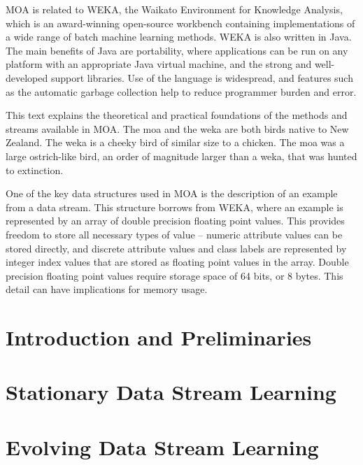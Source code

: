 \documentclass[a4paper,12pt,twoside]{book}
\begin{document}
MOA is related to WEKA, the Waikato
Environment for Knowledge Analysis, which is an award-winning open-source 
workbench containing implementations of a wide range of batch machine 
learning methods. WEKA is also written in Java. The main benefits
of Java are portability, where applications can be run on any platform with
an appropriate Java virtual machine, and the strong and well-developed support 
libraries. Use of the language is widespread, and features such as the
automatic garbage collection help to reduce programmer burden and error.

This text explains the theoretical and practical foundations of the methods and streams available in MOA.
The moa and the weka are both birds native to New Zealand. The weka is a cheeky bird of similar size to a chicken. The moa was a large ostrich-like bird, an order of magnitude larger than a weka, that was hunted to extinction.

\BEGINOMIT
    One of the key data structures used in MOA is the description of an example
from a data stream. This structure borrows from WEKA, where an example is
represented by an array of double precision floating point values. This provides
freedom to store all necessary types of value \--- numeric attribute values can be
stored directly, and discrete attribute values and class labels are represented
by integer index values that are stored as floating point values in the array.
Double precision floating point values require storage space of 64 bits, or 8
bytes. This detail can have implications for memory usage. %
\ENDOMIT

\part{Introduction and Preliminaries} 
 
\part{Stationary Data Stream Learning} 
\part{Evolving Data Stream Learning} 









\cleardoublepage

%



\end{document}

